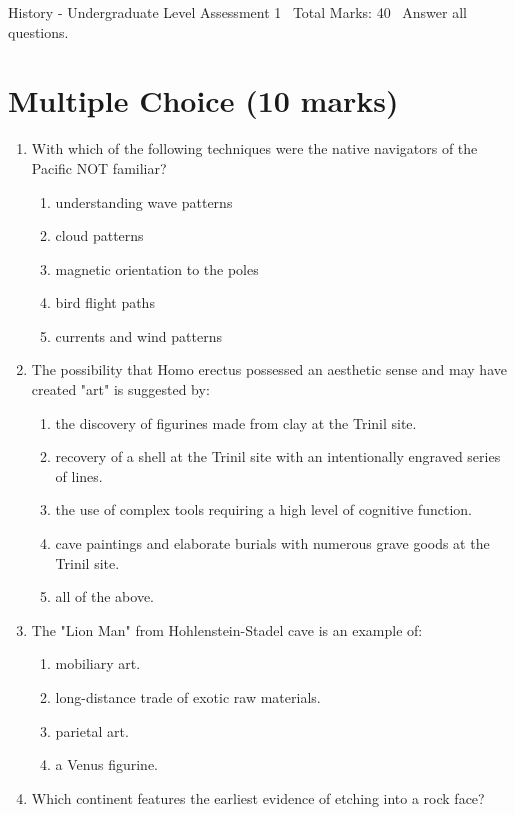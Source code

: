 \documentclass[12pt]{article}
\begin{document}
\begin{center}
History - Undergraduate Level Assessment 1 \
Total Marks: 40 \
Answer all questions.
\end{center}

\section*{Multiple Choice (10 marks)}
\begin{enumerate}[label=\arabic*.]
\item With which of the following techniques were the native navigators of the Pacific NOT
familiar?
\begin{enumerate}[label=(\alph*)]
    \item understanding wave patterns
    \item cloud patterns
    \item magnetic orientation to the poles
    \item bird flight paths
    \item currents and wind patterns
\end{enumerate}
\item The possibility that Homo erectus possessed an aesthetic sense and may have created "art"
is suggested by:
\begin{enumerate}[label=(\alph*)]
    \item the discovery of figurines made from clay at the Trinil site.
    \item recovery of a shell at the Trinil site with an intentionally engraved series of lines.
    \item the use of complex tools requiring a high level of cognitive function.
    \item cave paintings and elaborate burials with numerous grave goods at the Trinil site.
    \item all of the above.
\end{enumerate}
\item The "Lion Man" from Hohlenstein-Stadel cave is an example of:
\begin{enumerate}[label=(\alph*)]
    \item mobiliary art.
    \item long-distance trade of exotic raw materials.
    \item parietal art.
    \item a Venus figurine.
\end{enumerate}
\item Which continent features the earliest evidence of etching into a rock face?

\end{enumerate}
\end{document}
